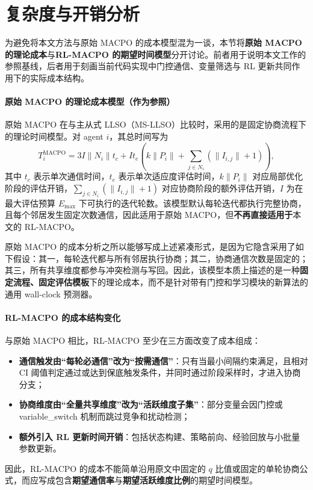 \documentclass[conference]{IEEEtran}
\begin{document}
\section{复杂度与开销分析}

为避免将本文方法与原始 MACPO 的成本模型混为一谈，本节将\textbf{原始 MACPO 的理论成本}与\textbf{RL-MACPO 的期望时间模型}分开讨论。前者用于说明本文工作的参照基线，后者用于刻画当前代码实现中门控通信、变量筛选与 RL 更新共同作用下的实际成本结构。

\paragraph{原始 MACPO 的理论成本模型（作为参照）}
原始 MACPO 在与主从式 LLSO（MS-LLSO）比较时，采用的是固定协商流程下的理论时间模型。对 agent $i$，其总时间写为
\[
T_i^{\mathrm{MACPO}}
=
3I\lVert N_i\rVert t_c
+ 
I t_e\left(k\lVert P_i\rVert+\sum_{j\in N_i}(\lVert I_{i,j}\rVert+1)\right),
\]
其中 $t_c$ 表示单次通信时间，$t_e$ 表示单次适应度评估时间，$k\lVert P_i\rVert$ 对应局部优化阶段的评估开销，$\sum_{j\in N_i}(\lVert I_{i,j}\rVert+1)$ 对应协商阶段的额外评估开销，$I$ 为在最大评估预算 $E_{\max}$ 下可执行的迭代轮数。该模型默认每轮迭代都执行完整协商，且每个邻居发生固定次数通信，因此适用于原始 MACPO，但\textbf{不再直接适用于}本文的 RL-MACPO。

原始 MACPO 的成本分析之所以能够写成上述紧凑形式，是因为它隐含采用了如下假设：其一，每轮迭代都与所有邻居执行协商；其二，协商通信次数是固定的；其三，所有共享维度都参与冲突检测与写回。因此，该模型本质上描述的是一种\textbf{固定流程、固定评估模板}下的理论成本，而不是针对带有门控和学习模块的新算法的通用 wall-clock 预测器。

\paragraph{RL-MACPO 的成本结构变化}
与原始 MACPO 相比，RL-MACPO 至少在三方面改变了成本组成：
\begin{itemize}
  \item \textbf{通信触发由“每轮必通信”改为“按需通信”}：只有当最小间隔约束满足，且相对 CI 阈值判定通过或达到保底触发条件，并同时通过阶段采样时，才进入协商分支；
\item \textbf{协商维度由“全量共享维度”改为“活跃维度子集”}：部分变量会因门控或 variable\_switch 机制而跳过竞争和扰动检测；
\item \textbf{额外引入 RL 更新时间开销}：包括状态构建、策略前向、经验回放与小批量参数更新。
\end{itemize}
因此，RL-MACPO 的成本不能简单沿用原文中固定的 $q$ 比值或固定的单轮协商公式，而应写成包含\textbf{期望通信率}与\textbf{期望活跃维度比例}的期望时间模型。
\end{document}
